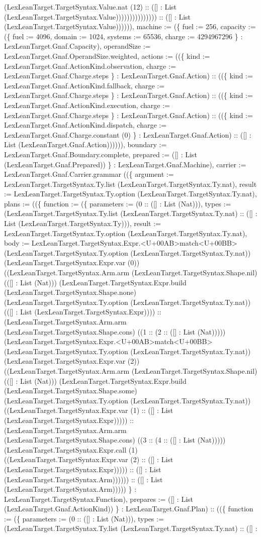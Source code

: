 \documentclass[11pt]{article}
\begin{document}
(LexLeanTarget.TargetSyntax.Value.nat (12) :: ([] : List (LexLeanTarget.TargetSyntax.Value))))))))))))))) :: ([] : List (LexLeanTarget.TargetSyntax.Value)))))), machine := (\{ fuel := 256, capacity := (\{ fuel := 4096, domain := 1024, systems := 65536, charge := 4294967296 \} : LexLeanTarget.Gnaf.Capacity), operandSize := LexLeanTarget.Gnaf.OperandSize.weighted, actions := ((\{ kind := LexLeanTarget.Gnaf.ActionKind.observation, charge := LexLeanTarget.Gnaf.Charge.steps \} : LexLeanTarget.Gnaf.Action) :: ((\{ kind := LexLeanTarget.Gnaf.ActionKind.fallback, charge := LexLeanTarget.Gnaf.Charge.steps \} : LexLeanTarget.Gnaf.Action) :: ((\{ kind := LexLeanTarget.Gnaf.ActionKind.execution, charge := LexLeanTarget.Gnaf.Charge.steps \} : LexLeanTarget.Gnaf.Action) :: ((\{ kind := LexLeanTarget.Gnaf.ActionKind.dispatch, charge := LexLeanTarget.Gnaf.Charge.constant (0) \} : LexLeanTarget.Gnaf.Action) :: ([] : List (LexLeanTarget.Gnaf.Action)))))), boundary := LexLeanTarget.Gnaf.Boundary.complete, prepared := ([] : List (LexLeanTarget.Gnaf.Prepared)) \} : LexLeanTarget.Gnaf.Machine), carrier := LexLeanTarget.Gnaf.Carrier.grammar ((\{ argument := LexLeanTarget.TargetSyntax.Ty.list (LexLeanTarget.TargetSyntax.Ty.nat), result := LexLeanTarget.TargetSyntax.Ty.option (LexLeanTarget.TargetSyntax.Ty.nat), plans := ((\{ function := (\{ parameters := (0 :: ([] : List (Nat))), types := (LexLeanTarget.TargetSyntax.Ty.list (LexLeanTarget.TargetSyntax.Ty.nat) :: ([] : List (LexLeanTarget.TargetSyntax.Ty))), result := LexLeanTarget.TargetSyntax.Ty.option (LexLeanTarget.TargetSyntax.Ty.nat), body := LexLeanTarget.TargetSyntax.Expr.<U+00AB>match<U+00BB> (LexLeanTarget.TargetSyntax.Ty.option (LexLeanTarget.TargetSyntax.Ty.nat)) (LexLeanTarget.TargetSyntax.Expr.var (0)) ((LexLeanTarget.TargetSyntax.Arm.arm (LexLeanTarget.TargetSyntax.Shape.nil) (([] : List (Nat))) (LexLeanTarget.TargetSyntax.Expr.build (LexLeanTarget.TargetSyntax.Shape.none) (LexLeanTarget.TargetSyntax.Ty.option (LexLeanTarget.TargetSyntax.Ty.nat)) (([] : List (LexLeanTarget.TargetSyntax.Expr)))) :: (LexLeanTarget.TargetSyntax.Arm.arm (LexLeanTarget.TargetSyntax.Shape.cons) ((1 :: (2 :: ([] : List (Nat))))) (LexLeanTarget.TargetSyntax.Expr.<U+00AB>match<U+00BB> (LexLeanTarget.TargetSyntax.Ty.option (LexLeanTarget.TargetSyntax.Ty.nat)) (LexLeanTarget.TargetSyntax.Expr.var (2)) ((LexLeanTarget.TargetSyntax.Arm.arm (LexLeanTarget.TargetSyntax.Shape.nil) (([] : List (Nat))) (LexLeanTarget.TargetSyntax.Expr.build (LexLeanTarget.TargetSyntax.Shape.some) (LexLeanTarget.TargetSyntax.Ty.option (LexLeanTarget.TargetSyntax.Ty.nat)) ((LexLeanTarget.TargetSyntax.Expr.var (1) :: ([] : List (LexLeanTarget.TargetSyntax.Expr))))) :: (LexLeanTarget.TargetSyntax.Arm.arm (LexLeanTarget.TargetSyntax.Shape.cons) ((3 :: (4 :: ([] : List (Nat))))) (LexLeanTarget.TargetSyntax.Expr.call (1) ((LexLeanTarget.TargetSyntax.Expr.var (2) :: ([] : List (LexLeanTarget.TargetSyntax.Expr))))) :: ([] : List (LexLeanTarget.TargetSyntax.Arm)))))) :: ([] : List (LexLeanTarget.TargetSyntax.Arm))))) \} : LexLeanTarget.TargetSyntax.Function), prepares := ([] : List (LexLeanTarget.Gnaf.ActionKind)) \} : LexLeanTarget.Gnaf.Plan) :: ((\{ function := (\{ parameters := (0 :: ([] : List (Nat))), types := (LexLeanTarget.TargetSyntax.Ty.list (LexLeanTarget.TargetSyntax.Ty.nat) :: ([] : 
\end{document}
